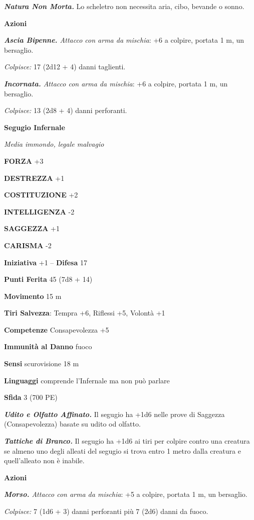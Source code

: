 \begin{multicols}{2}
\emph{\textbf{Natura Non Morta.}} Lo scheletro non necessita aria, cibo, bevande o sonno.

\textbf{Azioni}

\emph{\textbf{Ascia Bipenne.} Attacco con arma da mischia}: +6 a colpire, portata 1 m, un bersaglio.

\emph{Colpisce:} 17 (2d12 + 4) danni taglienti.

\emph{\textbf{Incornata.} Attacco con arma da mischia}: +6 a colpire, portata 1 m, un bersaglio.

\emph{Colpisce:} 13 (2d8 + 4) danni perforanti.

\medskip{}\textbf{Segugio Infernale}

\emph{Media immondo, legale malvagio}

\textbf{FORZA} +3

\textbf{DESTREZZA} +1

\textbf{COSTITUZIONE} +2

\textbf{INTELLIGENZA} -2

\textbf{SAGGEZZA} +1

\textbf{CARISMA} -2

\textbf{Iniziativa} +1 -- \textbf{Difesa} 17

\textbf{Punti Ferita} 45 (7d8 + 14)

\textbf{Movimento} 15 m

\textbf{Tiri Salvezza}: Tempra +6, Riflessi +5, Volontà +1

\textbf{Competenze} Consapevolezza +5

\textbf{Immunità al Danno} fuoco

\textbf{Sensi} scurovisione 18 m

\textbf{Linguaggi} comprende l'Infernale ma non può parlare

\textbf{Sfida} 3 (700 PE)

\emph{\textbf{Udito e Olfatto Affinato.}} Il segugio ha +1d6 nelle prove di Saggezza (Consapevolezza) basate su udito od olfatto.

\emph{\textbf{Tattiche di Branco.}} Il segugio ha +1d6 ai tiri per colpire contro una creatura se almeno uno degli alleati del segugio si trova entro 1 metro dalla creatura e quell'alleato non è inabile.

\textbf{Azioni}

\emph{\textbf{Morso.} Attacco con arma da mischia}: +5 a colpire,
portata 1 m, un bersaglio.

\emph{Colpisce:} 7 (1d6 + 3) danni perforanti più 7 (2d6) danni da
fuoco.


\end{multicols}
